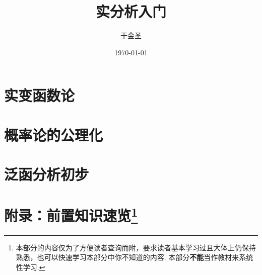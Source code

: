 \documentclass[lang=cn,10pt,device=pad,scheme=chinese,color=blue,thmcnt=section]{elegantbook}
\title{实分析入门}
\author{于金圣}
\institute{\'{E}cole d'\'{E}conomie de Toulouse -- Université Toulouse Capitole}
\date{\today}
\begin{document}
\maketitle
\frontmatter





\tableofcontents


\mainmatter



\setcounter{chapter}{-1}

\part{实变函数论}







\part{概率论的公理化}



\part{泛函分析初步}






\appendix
\part{附录：前置知识速览\footnote{本部分的内容仅为了方便读者查询而附，要求读者基本学习过且大体上仍保持熟悉，也可以快速学习本部分中你不知道的内容. 本部分\textbf{不能}当作教材来系统性学习.}}







\end{document}
